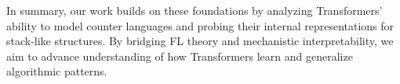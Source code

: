 
In summary, our work builds on these foundations by analyzing Transformers' ability to model counter languages and probing their internal representations for stack-like structures. By bridging FL theory and mechanistic interpretability, we aim to advance understanding of how Transformers learn and generalize algorithmic patterns.